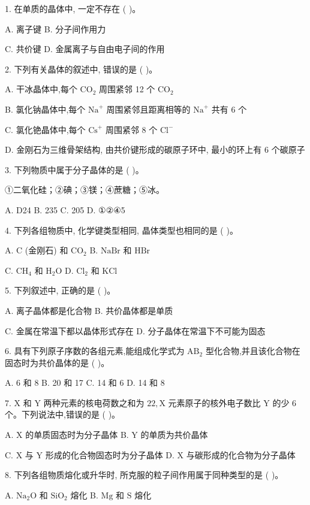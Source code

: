 \documentclass[10pt]{article}
\begin{document}
1. 在单质的晶体中, 一定不存在 ( )。

A. 离子键 B. 分子间作用力

C. 共价键 D. 金属离子与自由电子间的作用

2. 下列有关晶体的叙述中, 错误的是 ( )。

A. 干冰晶体中,每个 \({\mathrm{{CO}}}_{2}\) 周围紧邻 12 个 \({\mathrm{{CO}}}_{2}\)

B. 氯化钠晶体中,每个 \({\mathrm{{Na}}}^{ + }\) 周围紧邻且距离相等的 \({\mathrm{{Na}}}^{ + }\) 共有 6 个

C. 氯化铯晶体中,每个 \({\mathrm{{Cs}}}^{ + }\) 周围紧邻 8 个 \({\mathrm{{Cl}}}^{ - }\)

D. 金刚石为三维骨架结构, 由共价键形成的碳原子环中, 最小的环上有 6 个碳原子

3. 下列物质中属于分子晶体的是 ( )。

①二氧化硅；②碘；③镁；④蔗糖；⑤冰。

A. D24 B. 235 C. 205 D. ①②④5

4. 下列各组物质中, 化学键类型相同, 晶体类型也相同的是 ( )。

A. \(\mathrm{C}\) (金刚石) 和 \({\mathrm{{CO}}}_{2}\) B. \(\mathrm{{NaBr}}\) 和 \(\mathrm{{HBr}}\)

C. \({\mathrm{{CH}}}_{4}\) 和 \({\mathrm{H}}_{2}\mathrm{O}\) D. \({\mathrm{{Cl}}}_{2}\) 和 \(\mathrm{{KCl}}\)

5. 下列叙述中, 正确的是 ( )。

A. 离子晶体都是化合物 B. 共价晶体都是单质

C. 金属在常温下都以晶体形式存在 D. 分子晶体在常温下不可能为固态

6. 具有下列原子序数的各组元素,能组成化学式为 \({\mathrm{{AB}}}_{2}\) 型化合物,并且该化合物在固态时为共价晶体的是 ( )。

A. 6 和 8 B. 20 和 17 C. 14 和 6 D. 14 和 8

7. \(\mathrm{X}\) 和 \(\mathrm{Y}\) 两种元素的核电荷数之和为 \({22},\mathrm{X}\) 元素原子的核外电子数比 \(\mathrm{Y}\) 的少 6 个。下列说法中,错误的是 ( )。

A. \(\mathrm{X}\) 的单质固态时为分子晶体 B. \(\mathrm{Y}\) 的单质为共价晶体

C. \(\mathrm{X}\) 与 \(\mathrm{Y}\) 形成的化合物固态时为分子晶体 D. X 与碳形成的化合物为分子晶体

8. 下列各组物质熔化或升华时, 所克服的粒子间作用属于同种类型的是 ( )。

A. \({\mathrm{{Na}}}_{2}\mathrm{O}\) 和 \({\mathrm{{SiO}}}_{2}\) 熔化 B. \(\mathrm{{Mg}}\) 和 \(\mathrm{S}\) 熔化
\end{document}
